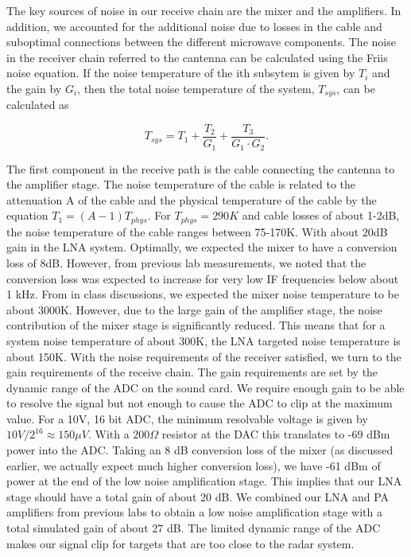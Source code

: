 \documentclass[reprint, aps, prl]{revtex4-1}
\begin{document}
The key sources of noise in our receive chain are the mixer and the amplifiers. In addition, we accounted for the additional noise due to losses in the cable and suboptimal connections between the different microwave components. The noise in the receiver chain referred to the cantenna can be calculated using the Friis noise equation. If the noise temperature of the ith subsytem is given by $T_i$ and the gain by $G_i$, then the total noise temperature of the system, $T_{sys}$, can be calculated as

\begin{equation}
T_{sys} = T_1 + \frac{T_2}{G_1} + \frac{T_3}{G_1 \cdot G_2}.
\end{equation}

The first component in the receive path is the cable connecting the cantenna to the amplifier stage. The noise temperature of the cable is related to the attenuation A of the cable and the physical temperature of the cable by the equation $T_1 = (A - 1) T_{phys}$. For $T_{phys} = 290 K$ and cable losses of about 1-2dB, the noise temperature of the cable ranges between 75-170K. With about 20dB gain in the LNA system. Optimally, we expected the mixer to have a conversion loss of 8dB. However, from previous lab measurements, we noted that the conversion loss was expected to increase for very low IF frequencies below about 1 kHz. From in class discussions, we expected the mixer noise temperature to be about 3000K. However, due to the large gain of the amplifier stage, the noise contribution of the mixer stage is significantly reduced. This means that for a system noise temperature of about 300K, the LNA targeted noise temperature is about 150K. With the noise requirements of the receiver satisfied, we turn to the gain requirements of the receive chain. The gain requirements are set by the dynamic range of the ADC on the sound card. We require enough gain to be able to resolve the signal but not enough to cause the ADC to clip at the maximum value. For a 10V, 16 bit ADC, the minimum resolvable voltage is given by $10 V/ 2^{16} \approx 150 \mu V$. With a $200 \Omega$ resistor at the DAC this translates to -69 dBm power into the ADC. Taking an 8 dB conversion loss of the mixer (as discussed earlier, we actually expect much higher conversion loss), we have -61 dBm of power at the end of the low noise amplification stage. This implies that our LNA stage should have a total gain of about 20 dB. We combined our LNA and PA amplifiers from previous labs to obtain a low noise amplification stage with a total simulated gain of about 27 dB. The limited dynamic range of the ADC makes our signal clip for targets that are too close to the radar system.
\end{document}
